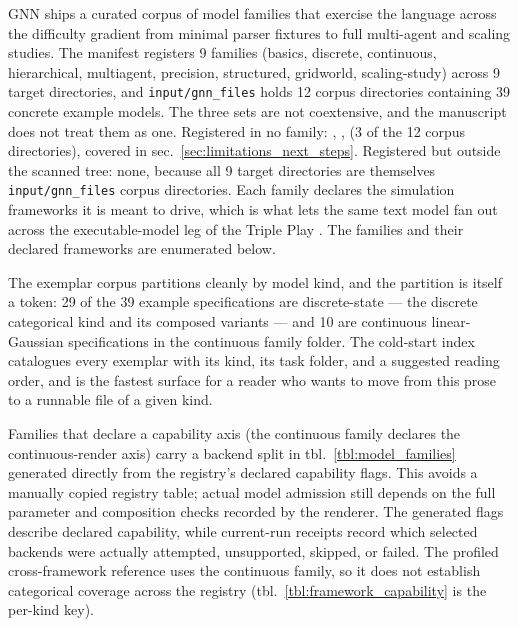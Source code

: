 \documentclass[
  english,
  9pt,
]{extarticle}
\newcounter{none} %
\begin{document}
GNN ships a curated corpus of model families that exercise the language
across the difficulty gradient from minimal parser fixtures to full
multi-agent and scaling studies. The manifest registers 9 families
(basics, discrete, continuous, hierarchical, multiagent, precision,
structured, gridworld, scaling-study) across 9 target directories, and
\texttt{input/gnn\_files} holds 12 corpus directories containing 39
concrete example models. The three sets are not coextensive, and the
manuscript does not treat them as one. Registered in no family:
, ,
 (3 of the 12 corpus directories),
covered in sec.~\ref{sec:limitations_next_steps}. Registered but outside
the scanned tree: none, because all 9 target directories are themselves
\texttt{input/gnn\_files} corpus directories. Each family declares the
simulation frameworks it is meant to drive, which is what lets the same
text model fan out across the executable-model leg of the Triple Play
\citep{gnn2023}. The families and their declared frameworks are
enumerated below.

The exemplar corpus partitions cleanly by model kind, and the partition
is itself a token: 29 of the 39 example specifications are
discrete-state --- the discrete categorical kind and its composed
variants --- and 10 are continuous linear-Gaussian specifications in the
continuous family folder. The cold-start index
 catalogues every exemplar with its
kind, its task folder, and a suggested reading order, and is the fastest
surface for a reader who wants to move from this prose to a runnable
file of a given kind.

Families that declare a capability axis (the continuous family declares
the continuous-render axis) carry a backend split in
tbl.~\ref{tbl:model_families} generated directly from the registry's
declared capability flags. This avoids a manually copied registry table;
actual model admission still depends on the full parameter and
composition checks recorded by the renderer. The generated flags
describe declared capability, while current-run receipts record which
selected backends were actually attempted, unsupported, skipped, or
failed. The profiled cross-framework reference uses the continuous
family, so it does not establish categorical coverage across the
registry (tbl.~\ref{tbl:framework_capability} is the per-kind key).
\end{document}
